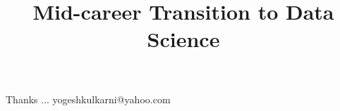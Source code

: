 \documentclass[xcolor=dvipsnames,compress,t,pdf,9pt]{beamer}
\title[\insertframenumber /\inserttotalframenumber]{Mid-career Transition to Data Science}
\begin{document}
	\begin{frame}
	\titlepage
%
	\end{frame}
	
	

	\begin{frame}[c]{}
	Thanks ...
	\vspace{5mm}
	yogeshkulkarni@yahoo.com
	\end{frame}
\end{document}
